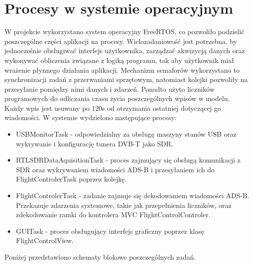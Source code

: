 \documentclass[eng,printmode]{mgr}
\begin{document}
\section{Procesy w systemie operacyjnym}
W projekcie wykorzystano system operacyjny FreeRTOS, co pozwoliło podzielić poszczególne części aplikacji na procesy. Wielozadaniowość jest potrzebna, by jednocześnie obsługiwać interfejs użytkownika, zarządzać akwizycją danych oraz wykonywać obliczenia związane z logiką programu, tak aby użytkownik miał wrażenie płynnego działania aplikacji. Mechanizm semaforów wykorzystano to synchronizacji zadań z przerwaniami sprzętowym, natomiast kolejki pozwoliły na przesyłanie pomiędzy nimi danych i zdarzeń. Ponadto użyto liczników programowych do odliczania czasu życia poszczególnych wpisów w modelu. Każdy wpis jest usuwany po 120s od otrzymania ostatniej dotyczącej go wiadomości.
\newpage
\noindent
W systemie wydzielono następujące procesy:
\begin{itemize}
\item USBMonitorTask - odpowiedzialny za obsługę maszyny stanów USB oraz wykrywanie i konfigurację tunera DVB-T jako SDR. 
  
\item RTLSDRDataAquisitionTask - proces zajmujący się obsługą komunikacji z SDR oraz wykrywaniem wiadomości ADS-B i przesyłaniem ich do FlightControlerTask poprzez kolejkę.
    
\item FlightControlerTask - zadanie zajmuje się dekodowaniem wiadomości ADS-B. Przekazuje zdarzenia systemowe, takie jak przepełnienia liczników, oraz zdekodowanie ramki do kontrolera MVC FlightControlControler.

\item GUITask - proces obsługujący interfejs graficzny poprzez klasę FlightControlView.
\end{itemize}
\noindent
Poniżej przedstawiono schematy blokowe poszczególnych zadań.
\end{document}
